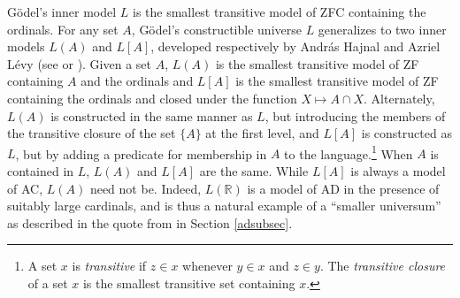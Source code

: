 \documentclass{book}%
\begin{document}
G\"{o}del's inner model $L$ is the smallest transitive model of
ZFC containing the ordinals. For any set $A$, G\"{o}del's constructible universe $L$ generalizes to two inner models $L(A)$ and $L[A]$, developed respectively by Andr\'{a}s Hajnal  and Azriel L\'{e}vy  (see \cite[Chapter 13]{Jech:settheory} or \cite[p.~34]{Kanamori}). Given a set $A$, $L(A)$
is the smallest transitive model of ZF containing $A$ and the ordinals and
$L[A]$ is the smallest transitive model of ZF containing the
ordinals and closed under the function $X \mapsto A \cap X$.  Alternately, $L(A)$ is constructed in the same manner as $L$, but introducing the members of the transitive closure of the set $\{A\}$ at the first level, and $L[A]$ is constructed as $L$, but by adding a predicate for membership in $A$ to the language.\footnote{A set $x$ is \emph{transitive} if $z \in x$ whenever
$y \in x$ and $z \in y$. The \emph{transitive closure} of a set $x$
is the smallest transitive set containing $x$.}  When $A$ is contained in $L$, $L(A)$ and
$L[A]$ are the same. While $L[A]$ is always a model of AC, $L(A)$ need not be.
Indeed, $L(\mathbb{R})$ is a model of AD in the presence of suitably large cardinals, and is thus a natural example of a ``smaller universum'' as described in the quote from \cite{MycielskiSteinhaus} in Section \ref{adsubsec}.
\end{document}
